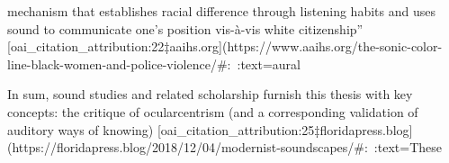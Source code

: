 \documentclass[12pt]{report}
\begin{document}
mechanism that establishes racial difference through listening habits and uses sound to communicate one’s position vis-à-vis white citizenship” [oai_citation_attribution:22‡aaihs.org](https://www.aaihs.org/the-sonic-color-line-black-women-and-police-violence/#:~:text=aural%

In sum, sound studies and related scholarship furnish this thesis with key concepts: the critique of ocularcentrism (and a corresponding validation of auditory ways of knowing) [oai_citation_attribution:25‡floridapress.blog](https://floridapress.blog/2018/12/04/modernist-soundscapes/#:~:text=These%
\end{document}
